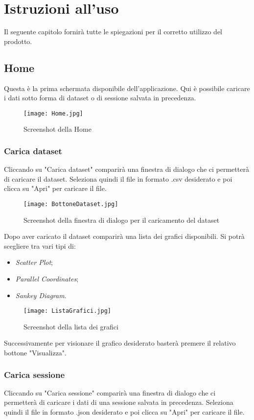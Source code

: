 \chapter{Istruzioni all'uso}
Il seguente capitolo fornirà tutte le spiegazioni per il corretto utilizzo del prodotto.

\section{Home}
Questa è la prima schermata disponibile dell'applicazione. Qui è possibile caricare i dati sotto forma di dataset o di sessione salvata in precedenza.

\begin{figure}[H]
    \texttt{[image: Home.jpg]}
    \caption{Screenshot della Home}
\end{figure}

\subsection{Carica dataset}
Cliccando su "Carica dataset" comparirà una finestra di dialogo che ci permetterà di caricare il dataset. Seleziona quindi il file in formato .csv desiderato e poi clicca su "Apri" per caricare il file.

\begin{figure}[H]
    \texttt{[image: BottoneDataset.jpg]}
    \caption{Screenshot della finestra di dialogo per il caricamento del dataset}
\end{figure}

Dopo aver caricato il dataset comparirà una lista dei grafici disponibili.
Si potrà scegliere tra vari tipi di:
\begin{itemize}
  \item \textit{Scatter Plot};
  \item \textit{Parallel Coordinates};
  \item \textit{Sankey Diagram}.
\end{itemize}

\begin{figure}[H]
    \texttt{[image: ListaGrafici.jpg]}
    \caption{Screenshot della lista dei grafici}
\end{figure}
Successivamente per visionare il grafico desiderato basterà premere il relativo bottone "Visualizza".

\subsection{Carica sessione}
Cliccando su "Carica sessione" comparirà una finestra di dialogo che ci permetterà di caricare i dati di una sessione salvata in precedenza. Seleziona quindi il file in formato .json desiderato e poi clicca su "Apri" per caricare il file.

